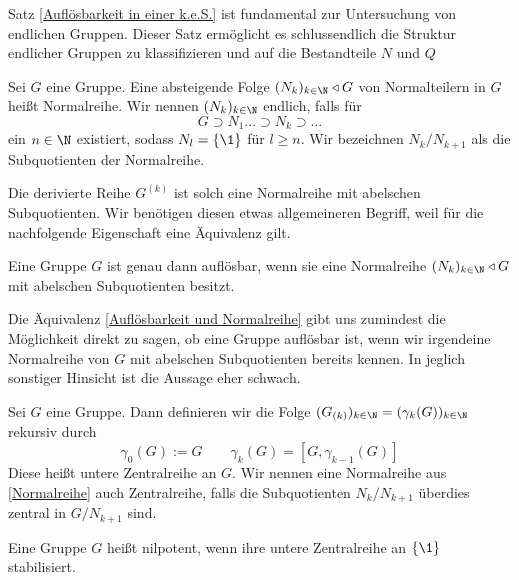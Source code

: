 \documentclass[11pt, a4paper]{article}
\begin{document}
\begin{note}
    Satz \ref{Auflösbarkeit in einer k.e.S.} ist fundamental zur Untersuchung von endlichen Gruppen. Dieser Satz ermöglicht es schlussendlich die Struktur endlicher Gruppen zu klassifizieren und auf die Bestandteile $N$ und $Q$
\end{note}

\begin{definition}
    Sei $G$ eine Gruppe. Eine absteigende Folge $(N_k)_{k\in \N} \triangleleft G$ von Normalteilern in $G$ heißt Normalreihe. Wir nennen $(N_k)_{k\in \N}$ endlich, falls für 
    $$G\supset N_1 ...\supset N_k \supset ...$$
    ein $n\in \N$ existiert, sodass $N_{l}= \{\1\}$ für $l\geq n$. Wir bezeichnen $N_k/N_{k+1}$ als die Subquotienten der Normalreihe.
\end{definition}

\begin{note} Die derivierte Reihe $G^{(k)}$ ist solch eine Normalreihe mit abelschen Subquotienten. Wir benötigen diesen etwas allgemeineren Begriff, weil für die nachfolgende Eigenschaft eine Äquivalenz gilt. \end{note}

\begin{theorem}
Eine Gruppe $G$ ist genau dann auflösbar, wenn sie eine Normalreihe $(N_k)_{k\in \N}\triangleleft G$ mit abelschen Subquotienten besitzt.
\end{theorem}

\begin{note} Die Äquivalenz \ref{Auflösbarkeit und Normalreihe} gibt uns zumindest die Möglichkeit direkt zu sagen, ob eine Gruppe auflösbar ist, wenn wir irgendeine Normalreihe von $G$ mit abelschen Subquotienten bereits kennen. In jeglich sonstiger Hinsicht ist die Aussage eher schwach.\end{note}

\begin{definition} Sei $G$ eine Gruppe. Dann definieren wir die Folge $(G_{(k)})_{k\in\N} = (\gamma_k(G))_{k\in\N}$ rekursiv durch
$$\gamma_0(G) := G \qquad \gamma_{k}(G) = [G,\gamma_{k-1}(G)]$$
Diese heißt untere Zentralreihe an $G$. Wir nennen eine Normalreihe aus \ref{Normalreihe} auch Zentralreihe, falls die Subquotienten $N_k/N_{k+1}$ überdies zentral in $G/N_{k+1}$ sind.
\end{definition}

\begin{definition}
Eine Gruppe $G$ heißt nilpotent, wenn ihre untere Zentralreihe an $\{\1\}$ stabilisiert. 

\end{definition}
\end{document}
